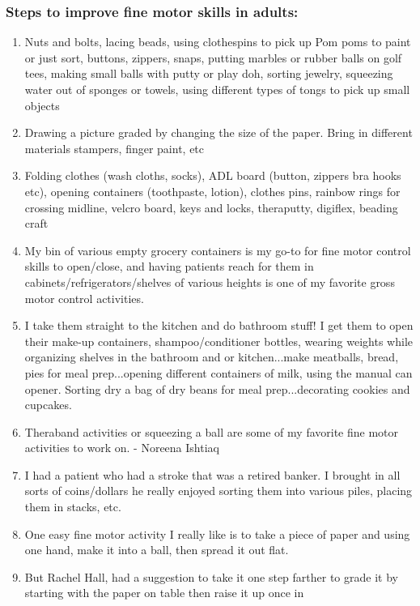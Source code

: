 \subsubsection{Steps to improve fine motor skills in adults:}

\begin{enumerate}
\item Nuts and bolts, lacing beads, using clothespins to pick up Pom poms to
paint or just sort, buttons, zippers, snaps, putting marbles or rubber
balls on golf tees, making small balls with putty or play doh, sorting
jewelry, squeezing water out of sponges or towels, using different types
of tongs to pick up small objects
\item  Drawing a picture graded by changing the size of the paper. Bring in
different materials stampers, finger paint, etc
\item  Folding clothes (wash cloths, socks), ADL board (button, zippers bra
hooks etc), opening containers (toothpaste, lotion), clothes pins,
rainbow rings for crossing midline, velcro board, keys and locks,
theraputty, digiflex, beading craft
\item  My bin of various empty grocery containers is my go-to for fine motor
control skills to open/close, and having patients reach for them in
cabinets/refrigerators/shelves of various heights is one of my favorite
gross motor control activities.
\item  I take them straight to the kitchen and do bathroom stuff! I get them
to open their make-up containers, shampoo/conditioner bottles, wearing
weights while organizing shelves in the bathroom and or kitchen...make
meatballs, bread, pies for meal prep...opening different containers of
milk, using the manual can opener. Sorting dry a bag of dry beans for
meal prep...decorating cookies and cupcakes.
\item  Theraband activities or squeezing a ball are some of my favorite fine
motor activities to work on. - Noreena Ishtiaq
\item  I had a patient who had a stroke that was a retired banker. I brought
in all sorts of coins/dollars he really enjoyed sorting them into
various piles, placing them in stacks, etc.
\item  One easy fine motor activity I really like is to take a piece of
paper and using one hand, make it into a ball, then spread it out flat.
\item  But Rachel Hall, had a suggestion to take it one step farther to
grade it by starting with the paper on table then raise it up once in

\end{enumerate}
